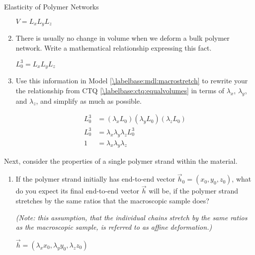 \begin{activity}{Elasticity of Polymer Networks}
\begin{ctqs}
\begin{enumerate}
		\begin{solution}[0.5in]
		
			$V = L_x L_y L_z$
		\end{solution}
	
			\item There is usually no change in volume when we deform a bulk polymer network.  Write a mathematical relationship expressing this fact.
		\label{\labelbase:ctq:equalvolumes}
	
		\begin{solution}[0.5in]
			$L_0^3 = L_x L_y L_z$
		\end{solution}
		
			\item Use this information in Model \ref{\labelbase:mdl:macrostretch} to rewrite your the relationship from CTQ \ref{\labelbase:ctq:equalvolumes} in terms of $\lambda_x$, $\lambda_y$, and $\lambda_z$, and simplify as much as possible.
	
		\begin{solution}[1.5in]
			\begin{align*}
				L_0^3 &= (\lambda_x L_0)(\lambda_y L_0)(\lambda_z L_0) \\
				L_0^3 & = \lambda_x \lambda_y \lambda_z L_0^3 \\
				1 &= \lambda_x \lambda_y \lambda_z
			\end{align*}
		\end{solution}
		
		\end{enumerate}
	
	\question Next, consider the properties of a single polymer strand within the material.
	
		\begin{enumerate}
			
			\item If the polymer strand initially has end-to-end vector $\vec h_0 = (x_0, y_0, z_0)$, what do you expect its final end-to-end vector $\vec h$ will be, if the polymer strand stretches by the same ratios that the macroscopic sample does?  
			
			\emph{(Note: this assumption, that the individual chains stretch by the same ratios as the macroscopic sample, is referred to as \emph{affine deformation}.)}
		
			\begin{solution}[1in]
				$\vec h = (\lambda_x x_0, \lambda_y y_0, \lambda_z z_0)$
			\end{solution}
			

\end{enumerate}
\end{ctqs}
\end{activity}
